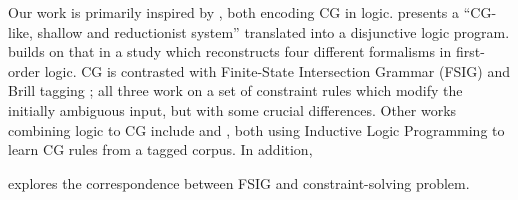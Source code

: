 


Our work is primarily inspired by \cite{lager98, lager_nivre01}, both encoding CG in logic.
\cite{lager98} presents a ``CG-like, shallow and reductionist system'' translated into a disjunctive logic program.
\cite{lager_nivre01} builds on that in a study which reconstructs
four different formalisms in first-order logic. 
CG is contrasted with Finite-State Intersection Grammar (FSIG) \cite{koskenniemi90} 
and Brill tagging ; all three work on a set of constraint rules 
which modify the initially ambiguous input, but with some crucial differences.
%
Other works combining logic to CG include
\cite{lindberg_eineborg98ilp} and \cite{asfrent14}, both using Inductive Logic Programming to learn CG rules from a tagged corpus.
In addition, \cite{lager01transformation} 

\cite{yli-jyra2001} explores the correspondence between FSIG and constraint-solving problem.






